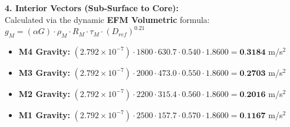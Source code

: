 \documentclass[11pt, a4paper]{article}
\begin{document}
  \vspace{0.5em}
  \noindent \textbf{4. Interior Vectors (Sub-Surface to Core):} \\[0.5em]
  \hspace*{1em} Calculated via the dynamic \textbf{EFM Volumetric} formula: $g_M = (\alpha G) \cdot \rho_{M} \cdot R_M \cdot \tau_M \cdot (D_{ref})^{0.21}$
  \begin{itemize}
    \item \textbf{M4 Gravity:} $(2.792 \times 10^{-7}) \cdot 1800 \cdot 630.7 \cdot 0.540 \cdot 1.8600 = \textbf{0.3184}$ m/s$^2$
    \item \textbf{M3 Gravity:} $(2.792 \times 10^{-7}) \cdot 2000 \cdot 473.0 \cdot 0.550 \cdot 1.8600 = \textbf{0.2703}$ m/s$^2$
    \item \textbf{M2 Gravity:} $(2.792 \times 10^{-7}) \cdot 2200 \cdot 315.4 \cdot 0.560 \cdot 1.8600 = \textbf{0.2016}$ m/s$^2$
    \item \textbf{M1 Gravity:} $(2.792 \times 10^{-7}) \cdot 2500 \cdot 157.7 \cdot 0.570 \cdot 1.8600 = \textbf{0.1167}$ m/s$^2$
  \end{itemize}
\end{document}

